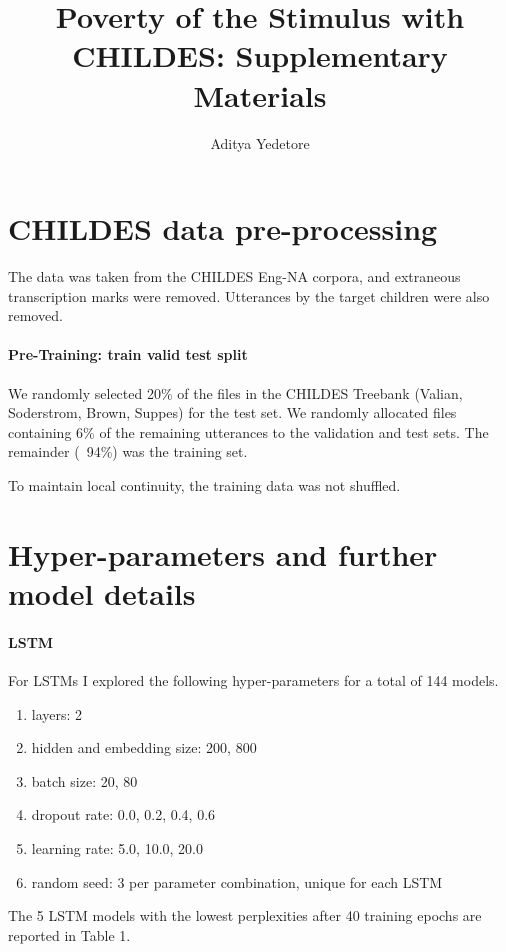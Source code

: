 \documentclass{article}
\title{Poverty of the Stimulus with CHILDES: Supplementary Materials}
\author{Aditya Yedetore}
\date{}
\begin{document}
\maketitle

\section*{CHILDES data pre-processing}
The data was taken from the CHILDES Eng-NA corpora, and extraneous transcription marks were removed. Utterances by the target children were also removed. 

\paragraph{Pre-Training: train valid test split}
We randomly selected 20\% of the files in the CHILDES Treebank (Valian, Soderstrom, Brown, Suppes) for the test set. We randomly allocated files containing 6\% of the remaining utterances to the validation and test sets. The remainder (~94\%) was the training set. 

To maintain local continuity, the training data was not shuffled. 


\section*{Hyper-parameters and further model details}
\paragraph{LSTM} For LSTMs I explored the following hyper-parameters for a total of 144 models. 

\begin{enumerate}
    \item layers: 2
    \item hidden and embedding size: 200, 800
    \item batch size: 20, 80 
    \item dropout rate: 0.0, 0.2, 0.4, 0.6 
    \item learning rate: 5.0, 10.0, 20.0
    \item random seed: 3 per parameter combination, unique for each LSTM
\end{enumerate}

The 5 LSTM models with the lowest perplexities after 40 training epochs are reported in Table 1. 
\end{document}
